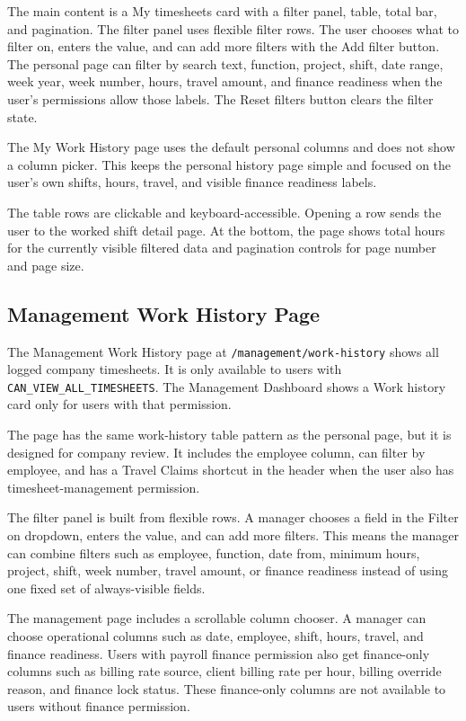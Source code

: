 \documentclass[11pt]{article}
\newcommand{\code}[1]{\nolinkurl{#1}}
\begin{document}
The main content is a My timesheets card with a filter panel, table, total bar, and pagination. The filter panel uses flexible filter rows. The user chooses what to filter on, enters the value, and can add more filters with the Add filter button. The personal page can filter by search text, function, project, shift, date range, week year, week number, hours, travel amount, and finance readiness when the user's permissions allow those labels. The Reset filters button clears the filter state.

The My Work History page uses the default personal columns and does not show a column picker. This keeps the personal history page simple and focused on the user's own shifts, hours, travel, and visible finance readiness labels.

The table rows are clickable and keyboard-accessible. Opening a row sends the user to the worked shift detail page. At the bottom, the page shows total hours for the currently visible filtered data and pagination controls for page number and page size.

\subsection{Management Work History Page}

The Management Work History page at \code{/management/work-history} shows all logged company timesheets. It is only available to users with \code{CAN_VIEW_ALL_TIMESHEETS}. The Management Dashboard shows a Work history card only for users with that permission.

The page has the same work-history table pattern as the personal page, but it is designed for company review. It includes the employee column, can filter by employee, and has a Travel Claims shortcut in the header when the user also has timesheet-management permission.

The filter panel is built from flexible rows. A manager chooses a field in the Filter on dropdown, enters the value, and can add more filters. This means the manager can combine filters such as employee, function, date from, minimum hours, project, shift, week number, travel amount, or finance readiness instead of using one fixed set of always-visible fields.

The management page includes a scrollable column chooser. A manager can choose operational columns such as date, employee, shift, hours, travel, and finance readiness. Users with payroll finance permission also get finance-only columns such as billing rate source, client billing rate per hour, billing override reason, and finance lock status. These finance-only columns are not available to users without finance permission.
\end{document}
